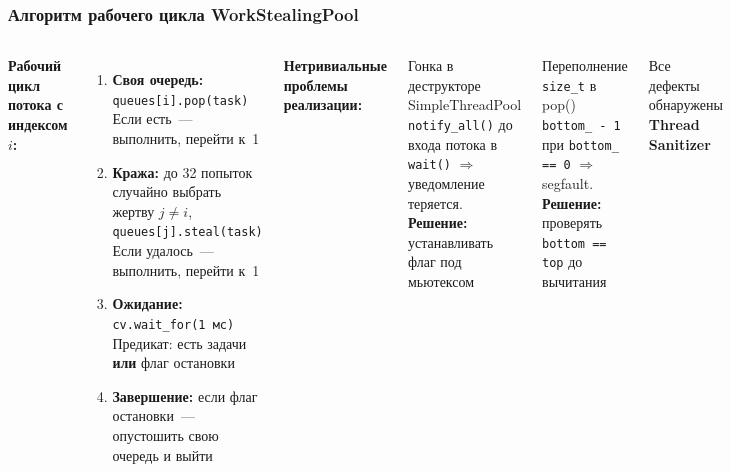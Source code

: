 \documentclass[pdf, hyperref={unicode}, aspectratio=169]{beamer}
\begin{document}
\begin{frame}
\frametitle{Алгоритм рабочего цикла WorkStealingPool}

\begin{columns}[T]

\textbf{Рабочий цикл потока с индексом $i$:}

\medskip
\begin{enumerate}
  \item \textbf{Своя очередь:} \texttt{queues[i].pop(task)}\\
        Если есть~--- выполнить, перейти к~1
  \item \textbf{Кража:} до 32 попыток\\
        случайно выбрать жертву $j \ne i$,\\
        \texttt{queues[j].steal(task)}\\
        Если удалось~--- выполнить, перейти к~1
  \item \textbf{Ожидание:}
        \texttt{cv.wait\_for(1\,мс)}\\
        Предикат: есть задачи \textbf{или} флаг
        остановки
  \item \textbf{Завершение:} если флаг
        остановки~--- опустошить свою очередь
        и выйти
\end{enumerate}

\textbf{Нетривиальные проблемы реализации:}

\begin{alertblock}{Гонка в деструкторе SimpleThreadPool}
  \texttt{notify\_all()} до входа потока в
  \texttt{wait()} $\Rightarrow$ уведомление
  теряется.\\
  \textbf{Решение:} устанавливать флаг под
  мьютексом
\end{alertblock}

\begin{alertblock}{Переполнение \texttt{size\_t} в pop()}
  \texttt{bottom\_ - 1} при
  \texttt{bottom\_ == 0} $\Rightarrow$
  segfault.\\
  \textbf{Решение:} проверять
  \texttt{bottom == top} до вычитания
\end{alertblock}

Все дефекты обнаружены \textbf{Thread Sanitizer}

\end{columns}
\end{frame}
\end{document}
